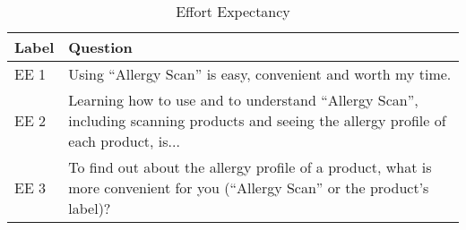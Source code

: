 \begin{table}[H]
\centering
\begin{tabular}{l l}

\toprule
Label & Question \\
\midrule
EE 1    &	Using “Allergy Scan” is easy, convenient and worth my time. \\
EE 2    &	Learning how to use and to understand “Allergy Scan”, including scanning products and seeing the allergy profile of each product, is... \\
EE 3    &	To find out about the allergy profile of a product, what is more convenient for you (“Allergy Scan” or the product’s label)? \\

\bottomrule

\end{tabular}
\caption{Effort Expectancy}
\end{table}